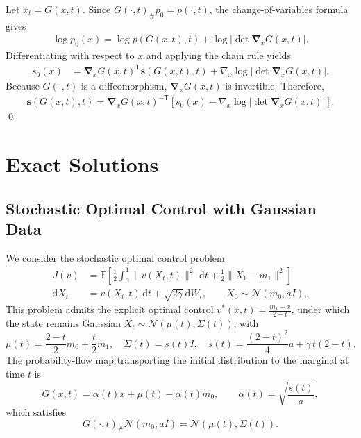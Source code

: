 \documentclass[preprint]{elsarticle}
\newcommand{\rd}{\mathrm{d}}
\newcommand{\dd}{\,\mathrm{d}}          %
\begin{document}
Let $x_t=G(x,t)$. Since $G(\cdot,t)_\#p_0=p(\cdot,t)$, the change-of-variables formula gives
\begin{align}
    \log p_0(x)
    =
    \log p(G(x,t),t)
    +
    \log\left|\det\boldsymbol{\nabla}_xG(x,t)\right|.
    \label{equ:proof_change_variables}
\end{align}
Differentiating with respect to $x$ and applying the chain rule yields
\begin{align*}
    s_0(x)
    &=
    \boldsymbol{\nabla}_xG(x,t)^{\mathsf T}
    \mathbf{s}(G(x,t),t)
    +
    \nabla_x
    \log\left|\det\boldsymbol{\nabla}_xG(x,t)\right|.
\end{align*}
Because $G(\cdot,t)$ is a diffeomorphism, $\boldsymbol{\nabla}_xG(x,t)$ is invertible. Therefore,
\begin{align*}
    \mathbf{s}(G(x,t),t)
    =
    \boldsymbol{\nabla}_xG(x,t)^{-\mathsf T}
    \left[
        s_0(x)
        -
        \nabla_x
        \log\left|\det\boldsymbol{\nabla}_xG(x,t)\right|
    \right].
\end{align*}
\qed

\section{Exact Solutions}\label{sec:appendix_exact_sol}

\subsection{Stochastic Optimal Control with Gaussian Data}
\label{sec:appendix_soc}

We consider the stochastic optimal control problem
\begin{align*}
J(v)
&=
\mathbb E\!\left[
\frac12\int_0^1\|v(X_t,t)\|^2\,\dd t
+
\frac12\|X_1-m_1\|^2
\right]\\
\rd X_t&=v(X_t,t)\,\rd t+\sqrt{2\gamma}\,\rd W_t,
\qquad
X_0\sim\mathcal N(m_0,aI),
\end{align*}
This problem admits the explicit optimal control $v^*(x,t)=\frac{m_1-x}{2-t}$, under which the state remains Gaussian $X_t\sim\mathcal N(\mu(t),\Sigma(t))$, with
\[
\mu(t)=\frac{2-t}{2}m_0+\frac{t}{2}m_1,\quad 
\Sigma(t)=s(t)I,\quad s(t)=\frac{(2-t)^2}{4}a+\gamma\,t(2-t).
\]
The probability-flow map transporting the initial distribution to the marginal at time \(t\) is
\[
G(x,t)
=
\alpha(t)x
+
\mu(t)
-
\alpha(t)m_0,
\qquad
\alpha(t)
=
\sqrt{\frac{s(t)}{a}},
\]
which satisfies
\[
G(\cdot,t)_\#\mathcal N(m_0,aI)
=
\mathcal N(\mu(t),\Sigma(t)).
\]
\end{document}
